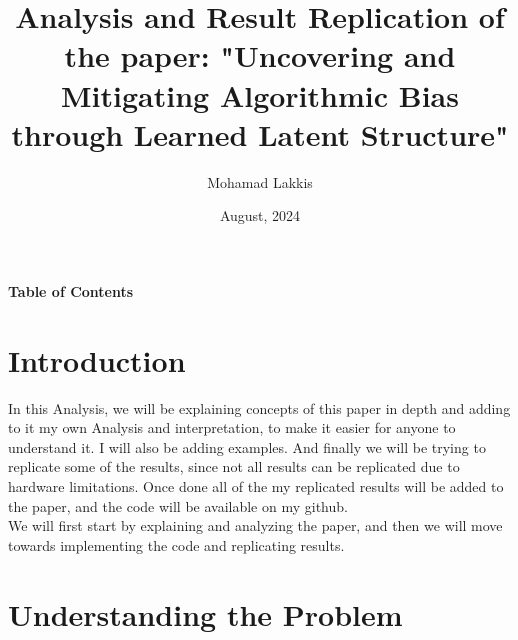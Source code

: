 \documentclass{article}
\title{Analysis and Result Replication of the paper: "Uncovering and Mitigating Algorithmic Bias through Learned Latent Structure"}
\author{Mohamad Lakkis}
\date{August, 2024}
\begin{document}
\maketitle
\begin{center}
  \textbf{\Large Table of Contents}
\end{center}

      

\newpage




\section {Introduction}
In this Analysis, we will be explaining concepts of this paper in depth and adding to it my own Analysis and interpretation, to make it easier for anyone to understand it. 
I will also be adding examples. And finally we will be trying to replicate some of the results, since not all results can be replicated due to hardware limitations. Once done all of the
my replicated results will be added to the paper, and the code will be available on my github. \\ 
We will first start by explaining and analyzing the paper, and then we will move towards implementing the code and replicating results. 
\section {Understanding the Problem}
\end{document}
